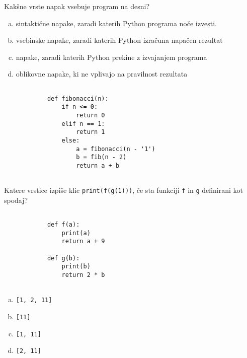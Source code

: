 \documentclass[arhiv, 10pt]{../izpit}
\newcommand{\inlinepy}[1]{\texttt{#1}}
\begin{document}
        \naloga*
        \begin{multicols}{2}
        \noindent
        Kakšne vrste napak vsebuje program na desni?

        \begin{enumerate}[(a)]
\item sintaktične napake, zaradi katerih Python programa noče izvesti.
\item vsebinske napake, zaradi katerih Python izračuna napačen rezultat
\item napake, zaradi katerih Python prekine z izvajanjem programa
\item oblikovne napake, ki ne vplivajo na pravilnost rezultata
\end{enumerate}

        \columnbreak

        \begin{verbatim}
        
            def fibonacci(n):
                if n <= 0:
                    return 0
                elif n == 1:
                    return 1
                else:
                    a = fibonacci(n - '1')
                    b = fib(n - 2)
                    return a + b
            
        \end{verbatim}

        \end{multicols}

    
        \naloga*
        Katere vrstice izpiše klic \inlinepy{print(f(g(1)))}, če sta funkciji \inlinepy{f} in \inlinepy{g} definirani kot spodaj?

        \begin{multicols}{2}
        \begin{verbatim}
        
            def f(a):
                print(a)
                return a + 9

            def g(b):
                print(b)
                return 2 * b
        
        \end{verbatim}

        \begin{enumerate}[(a)]
\item \inlinepy{[1, 2, 11]}
\item \inlinepy{[11]}
\item \inlinepy{[1, 11]}
\item \inlinepy{[2, 11]}
\end{enumerate}

        \end{multicols}
    
\end{document}
